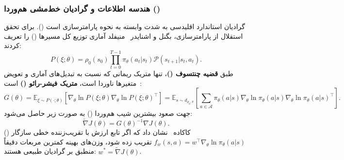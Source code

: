 \subsubsection*{هندسه اطلاعات و گرادیان خط‌مشی هم‌وردا ()}
گرادیان استاندارد اقلیدسی به شدت وابسته به نحوه پارامترسازی است (). برای تحقق استقلال از پارامترسازی، بگنل و اشنایدر~\cite{bagnell2003covariant} منیفلد آماری توزیع کل مسیرها () را تعریف کردند:
\begin{equation}
P(\xi; \theta) = \rho_0(s_0) \prod_{t=0}^{T-1} \pi_\theta(a_t | s_t) \mathcal{P}(s_{t+1} | s_t, a_t).
\end{equation}
طبق \textbf{قضیه چنتسوف ()}، تنها متریک ریمانی که نسبت به تبدیل‌های آماری و تعویض متغیرها ناوردا است، \textbf{متریک فیشر-رائو ()} است~\cite{bagnell2003covariant, kakade2002natural}:
\begin{equation}
G(\theta) = \mathbb{E}_{\xi \sim P(\cdot; \theta)} \left[ \nabla_\theta \ln P(\xi; \theta) \nabla_\theta \ln P(\xi; \theta)^\top \right] = \mathbb{E}_{s \sim d_{\rho_0, \pi}} \left[ \sum_{a \in \mathcal{A}} \pi_\theta(a|s) \nabla_\theta \ln \pi_\theta(a|s) \nabla_\theta \ln \pi_\theta(a|s)^\top \right].
\end{equation}
جهت صعود بیشترین شیب هم‌وردا () به صورت زیر حاصل می‌شود:
\begin{equation}
\widetilde{\nabla} J(\theta) = G(\theta)^{-1} \nabla J(\theta).
\end{equation}
کاکاده~\cite{kakade2002natural} نشان داد که اگر تابع ارزش با تقریب‌زننده خطی سازگار () $f_w(s, a) = w^\top \nabla_\theta \ln \pi_\theta(a|s)$ تقریب زده شود، وزن‌های بهینه کمترین مربعات دقیقاً منطبق بر گرادیان طبیعی هستند: $w^* = \widetilde{\nabla} J(\theta)$.

